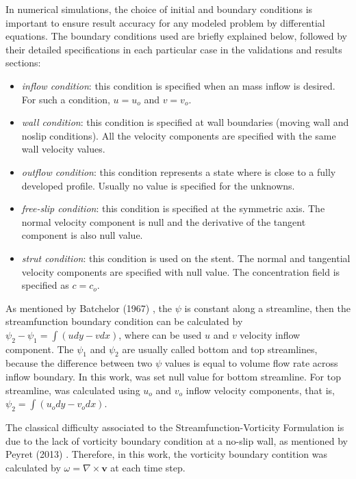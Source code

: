 In numerical simulations, the choice of initial and boundary conditions
is important to ensure result accuracy for any modeled problem 
by differential equations. 
The boundary conditions used
are briefly explained below, 
followed by their detailed specifications 
in each particular case in the validations and results sections:

\begin{itemize}
 \item \textit{inflow condition}:
 this condition is specified when an mass inflow is desired.
 For such a condition, $u = u_{o}$
 and $v = v_{o}$.

 \item \textit{wall condition}:
 this condition is specified at wall boundaries (moving wall
 and noslip conditions).
 All the velocity components are specified with 
 the same wall velocity values.

 \item \textit{outflow condition}: 
 this condition represents a state where is close to a
 fully developed profile.
 Usually no value is specified for the unknowns.

 \item \textit{free-slip condition}: 
 this condition is specified at the symmetric axis.
 The normal velocity component is null and the derivative of
 the tangent component is also null value.

 \item \textit{strut condition}: 
 this condition is used on the stent. The normal and tangential
 velocity components are specified with null value. 
 The concentration field is specified as $c=c_{o}$.
\end{itemize}

As mentioned by Batchelor (1967) \cite{batchelor1967},
the $\psi$ is constant along a streamline, then
the streamfunction boundary condition can be calculated by
$\psi_{2} - \psi_{1} = \int \left(udy - vdx\right)$,
where can be used $u$ and $v$ velocity inflow component.
The $\psi_{1}$ and $\psi_{2}$ are usually called 
bottom and top streamlines, because the difference
between two $\psi$ values is equal to volume flow
rate across inflow boundary. In this work, was set
null value for bottom streamline. For top streamline,
was calculated using $u_{o}$ and $v_{o}$ inflow velocity
components, that is, $\psi_{2} = \int \left(u_{o}dy - v_{o}dx\right)$.

\medskip
The classical difficulty associated to the
Streamfunction-Vorticity Formulation is due to the lack of vorticity
boundary condition at a no-slip wall, as mentioned by Peyret (2013)
 \cite{peyret2013}.
Therefore, in this work, the vorticity boundary contition
was calculated by $\omega = \nabla \times \textbf{v}$
at each time step.
